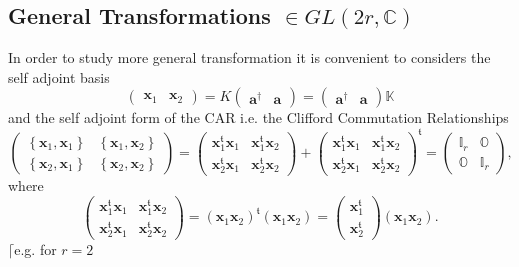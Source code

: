 \documentclass[aps, preprint]{revtex4}
\begin{document}
\subsection{General Transformations $ \in G L \left (2 r ,\mathbb{C}\right )$}
In order to study more general transformation it is convenient to considers the self adjoint basis
\begin{equation}\left (\begin{array}{cc}\mathbf{x}_{1} & \mathbf{x}_{2}\end{array}\right ) =K \left (\begin{array}{cc}\mathbf{a}^{ \dag } & \mathbf{a}\end{array}\right ) =\left (\begin{array}{cc}\mathbf{a}^{ \dag } & \mathbf{a}\end{array}\right ) \mathbb{K}
\end{equation}and the self adjoint form of the CAR i.e. the Clifford Commutation Relationships
\begin{equation*}\left (\begin{array}{cc}\left \{\mathbf{x}_{1} ,\mathbf{x}_{1}\right \} & \left \{\mathbf{x}_{1} ,\mathbf{x}_{2}\right \} \\
\left \{\mathbf{x}_{2} ,\mathbf{x}_{1}\right \} & \left \{\mathbf{x}_{2} ,\mathbf{x}_{2}\right \}\end{array}\right ) =\left (\begin{array}{cc}\mathbf{x}_{1}^{\mathfrak{t}} \mathbf{x}_{1} & \mathbf{x}_{1}^{\mathfrak{t}} \mathbf{x}_{2} \\
\mathbf{x}_{2}^{\mathfrak{t}} \mathbf{x}_{1} & \mathbf{x}_{2}^{\mathfrak{t}} \mathbf{x}_{2}\end{array}\right ) +\left (\begin{array}{cc}\mathbf{x}_{1}^{\mathfrak{t}} \mathbf{x}_{1} & \mathbf{x}_{1}^{\mathfrak{t}} \mathbf{x}_{2} \\
\mathbf{x}_{2}^{\mathfrak{t}} \mathbf{x}_{1} & \mathbf{x}_{2}^{\mathfrak{t}} \mathbf{x}_{2}\end{array}\right )^{\mathfrak{t}} =\left (\begin{array}{cc}\mathbb{I}_{r} & \mathbb{O} \\
\mathbb{O} & \mathbb{I}_{r}\end{array}\right )\text{,}
\end{equation*}where
\begin{equation}\left (\begin{array}{cc}\mathbf{x}_{1}^{\mathfrak{t}} \mathbf{x}_{1} & \mathbf{x}_{1}^{\mathfrak{t}} \mathbf{x}_{2} \\
\mathbf{x}_{2}^{\mathfrak{t}} \mathbf{x}_{1} & \mathbf{x}_{2}^{\mathfrak{t}} \mathbf{x}_{2}\end{array}\right ) =\left (\mathbf{x}_{1} \mathbf{x}_{2}\right )^{\mathfrak{t}} \left (\mathbf{x}_{1} \mathbf{x}_{2}\right ) =\left (\begin{array}{c}\mathbf{x}_{1}^{\mathfrak{t}} \\
\mathbf{x}_{2}^{\mathfrak{t}}\end{array}\right ) \left (\mathbf{x}_{1} \mathbf{x}_{2}\right )\text{.}
\end{equation}$\lceil $e.g. for $r =2$
\end{document}
